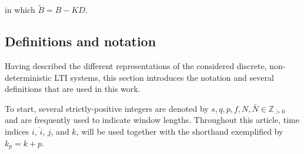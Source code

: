 in which $\tilde{B}=B-KD$.
%
%
%
\subsection{Definitions and notation}\label{sec:notation}
Having described the different representations of the considered discrete, non-deterministic \ac{LTI} systems, this section introduces the notation and several definitions that are used in this work.

To start, several strictly-positive integers are denoted by $s,q,p,f,N,\bar{N}\in\mathbb{Z}_{>0}$ and are frequently used to indicate window lengths. Throughout this article, time indices $i$, $\hat{i}$, $j$, and $k$, will be used together with the shorthand exemplified by $k_p=k+p$.

